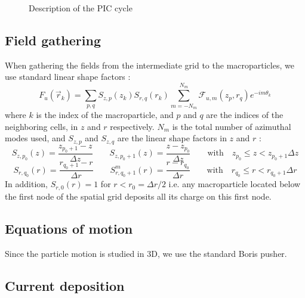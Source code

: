 \documentclass[a4paper]{article}   	%
\begin{document}
\begin{figure}

\caption{Description of the PIC cycle \label{fig:GlobalScheme}}
\end{figure}

\subsection{Field gathering}

When gathering the fields from the intermediate grid to the macroparticles,
we use standard linear shape factors :
\[ F_u(\vec{r}_k) =  \sum_{p,q} S_{z,p}(z_k)
S_{r,q}(r_k) \sum_{m=-N_m}^{N_m} \mathcal{F}_{u,m}(z_p, r_q) e^{-im\theta_k} \]
where $k$ is the index of the macroparticle, and $p$ and $q$ are the
indices of the neighboring cells, in $z$ and $r$ respectively. $N_m$ is the total number
of azimuthal modes used, and $S_{z,p}$ and $S_{z,q}$ are the linear
shape factors in $z$ and $r$ :
\[ S_{z,p_0}(z) = \frac{z_{p_0+1}- z}{\Delta z}  \qquad 
S_{z,p_0 +1}(z) = \frac{ z - z_{p_0} }{\Delta z} \qquad
\mathrm{with} \quad z_{p_0} \leq z < z_{p_0 +1} \Delta z \]
\[ S_{r,q_0}(r) = \frac{ r_{q_0+1} - r }{  \Delta r }
\qquad S^m_{r,q_0+1}(r) = \frac{ r - r_{q_0} }{  \Delta r }
\qquad \mathrm{with} \quad r_{q_0} \leq r < r_{q_0+1}
\Delta r \]
In addition, $S_{r,0}(r) = 1$ for $r< r_0 = \Delta r/2$ i.e. any macroparticle
located below the first node of the spatial grid deposits all its charge on
this first node.

\subsection{Equations of motion}

Since the particle motion is studied in 3D, we use the standard Boris pusher.

\subsection{Current deposition}
\end{document}
